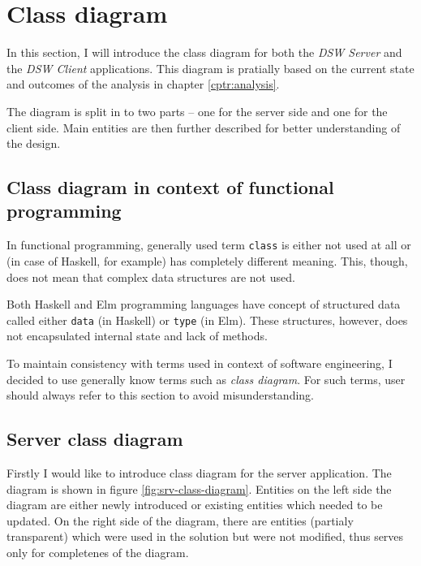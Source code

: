 \section{Class diagram}\label{sec:class-diagram}

In this section, I will introduce the class diagram for both the \textit{DSW Server} and the \textit{DSW Client} applications.
This diagram is pratially based on the current state and outcomes of the analysis in chapter \ref{cptr:analysis}.

The diagram is split in to two parts -- one for the server side and one for the client side.
Main entities are then further described for better understanding of the design.

\subsection{Class diagram in context of functional programming}

In functional programming, generally used term \texttt{class} is either not used at all or (in case of Haskell, for example) has completely different meaning.
This, though, does not mean that complex data structures are not used.

Both Haskell and Elm programming languages have concept of structured data called either \texttt{data} (in Haskell) or \texttt{type} (in Elm).
These structures, however, does not encapsulated internal state and lack of methods.

To maintain consistency with terms used in context of software engineering, I decided to use generally know terms such as \textit{class diagram}.
For such terms, user should always refer to this section to avoid misunderstanding.

\subsection{Server class diagram}

Firstly I would like to introduce class diagram for the server application.
The diagram is shown in figure \ref{fig:srv-class-diagram}.
Entities on the left side the diagram are either newly introduced or existing entities which needed to be updated.
On the right side of the diagram, there are entities (partialy transparent) which were used in the solution but were not modified, thus serves only for completenes of the diagram.


